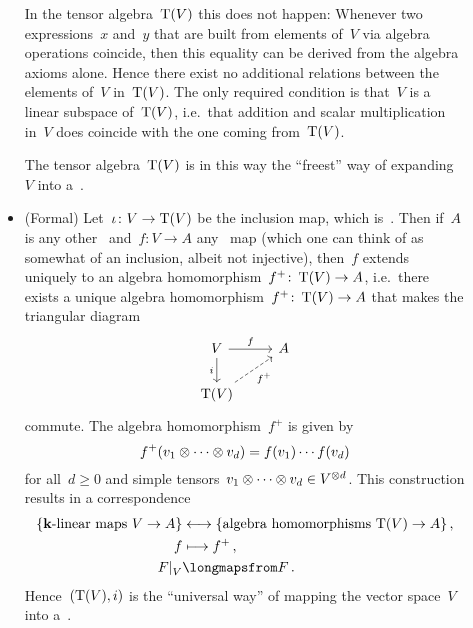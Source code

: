 \begin{recall}
\begin{description}
\begin{itemize}
          In the tensor algebra~$\operatorname{T}(V)$ this does not happen:
          Whenever two expressions~$x$ and~$y$ that are built from elements of~$V$ via algebra operations coincide, then this equality can be derived from the algebra axioms alone.
          Hence there exist no additional relations between the elements of~$V$ in~$\operatorname{T}(V)$.
          The only required condition is that~$V$ is a linear subspace of~$\operatorname{T}(V)$, i.e.\ that addition and scalar multiplication in~$V$ does coincide with the one coming from~$\operatorname{T}(V)$.
          
          The tensor algebra~$\operatorname{T}(V)$ is in this way the \enquote{freest} way of expanding~$V$ into a~{\algebra{$\kf$}}.
        \item(Formal)
          Let~$\iota \colon V \to \operatorname{T}(V)$ be the inclusion map, which is~{\linear{$\kf$}}.
          Then if~$A$ is any other~{\algebra{$\kf$}} and~$f \colon V \to A$ any~{\linear{$\kf$}} map (which one can think of as somewhat of an inclusion, albeit not injective), then~$f$ extends uniquely to an algebra homomorphism~$f^+ \colon \operatorname{T}(V) \to A$, i.e.\ there exists a unique algebra homomorphism~$f^+ \colon \operatorname{T}(V) \to A$ that makes the triangular diagram
          \[
            \begin{tikzcd}
              V
              \arrow{r}[above]{f}
              \arrow{d}[left]{i}
              &
              A
              \\
              \Tensor(V)
              \arrow[dashed]{ur}[below right]{f^+}
              &
              {}
            \end{tikzcd}
          \]
          commute.
          The algebra homomorphism~$f^+$ is given by
          \[
            f^+(v_1 \otimes \dotsb \otimes v_d)
            =
            f(v_1) \dotsm f(v_d)
          \]
          for all~$d \geq 0$ and simple tensors~$v_1 \otimes \dotsb \otimes v_d \in V^{\otimes d}$.
          This construction results in a {\onetoone} correspondence
          \begin{align*}
            \{ \text{\linear{$\kf$} maps~$V \to A$} \}
            &\longonetoone
            \{ \text{algebra homomorphisms~$\Tensor(V) \to A$} \} \,,
            \\
            f
            &\longmapsto
            f^+ \,,
            \\
            \restrict{F}{V}
            &\longmapsfrom
            F \,.
          \end{align*}
          Hence~$(\operatorname{T}(V), i)$ is the \enquote{universal way} of mapping the vector space~$V$ into a~{\algebra{$\kf$}}.
          

\end{itemize}
\end{description}
\end{recall}
